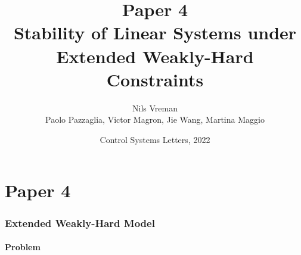\section{Paper 4}

\title[PhD Defence]{
    {\Huge Paper 4} \\
    \vspace{2mm}
    {\Large Stability of Linear Systems under\\Extended Weakly-Hard Constraints} \\
}
\author[Nils Vreman]{
    Nils Vreman \\
    \vspace{3mm}
    {\large Paolo Pazzaglia, Victor Magron, Jie Wang, Martina Maggio}
}
\date[LCSS 2022]{
    Control Systems Letters, 2022\\
}
\notitlelogo
{}


\begin{frame}
    \frametitle{Extended Weakly-Hard Model}%
    \framesubtitle{Problem}%
    \begin{figure}[h]
        \centering
    \end{figure}
\end{frame}

